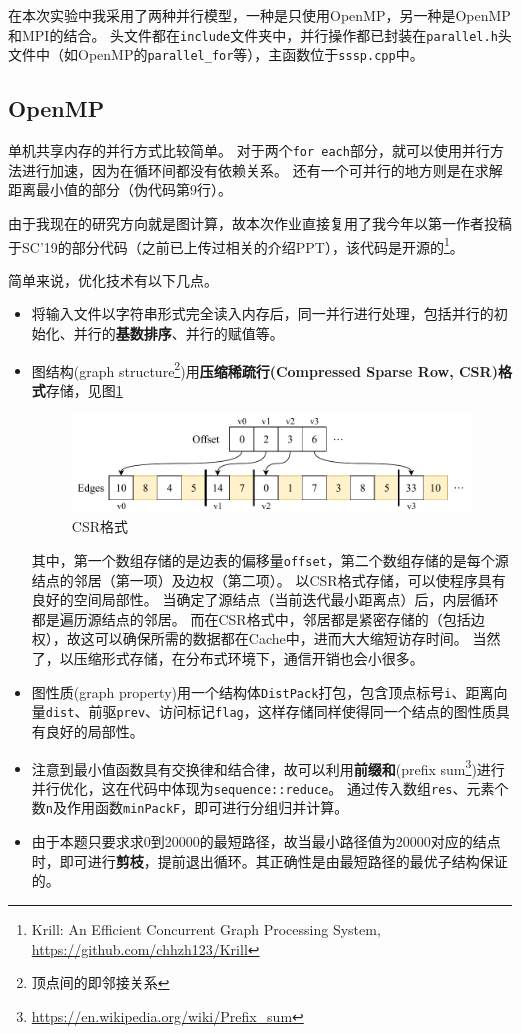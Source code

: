 \documentclass[reportComp]{thesis}
\begin{document}
在本次实验中我采用了两种并行模型，一种是只使用OpenMP，另一种是OpenMP和MPI的结合。
头文件都在\verb'include'文件夹中，并行操作都已封装在\verb'parallel.h'头文件中（如OpenMP的\verb'parallel_for'等），主函数位于\verb'sssp.cpp'中。

\subsection{OpenMP}
\label{sub:openmp}
单机共享内存的并行方式比较简单。
对于两个\verb'for each'部分，就可以使用并行方法进行加速，因为在循环间都没有依赖关系。
还有一个可并行的地方则是在求解距离最小值的部分（伪代码第9行）。

由于我现在的研究方向就是图计算，故本次作业直接复用了我今年以第一作者投稿于SC'19的部分代码（之前已上传过相关的介绍PPT），该代码是开源的\footnote{Krill: An Efficient Concurrent Graph Processing System, \url{https://github.com/chhzh123/Krill}}。

简单来说，优化技术有以下几点。
\begin{itemize}
	\item 将输入文件以字符串形式完全读入内存后，同一并行进行处理，包括并行的初始化、并行的\textbf{基数排序}、并行的赋值等。
	\item 图结构(graph structure\footnote{顶点间的即邻接关系})用\textbf{压缩稀疏行(Compressed Sparse Row, CSR)格式}存储，见图\ref{fig:csr}
	\begin{figure}[H]
	\centering
	\includegraphics[width=0.8\linewidth]{fig/CSR.pdf}
	\caption{CSR格式}
	\label{fig:csr}
	\end{figure}
	其中，第一个数组存储的是边表的偏移量\verb'offset'，第二个数组存储的是每个源结点的邻居（第一项）及边权（第二项）。
	以CSR格式存储，可以使程序具有良好的空间局部性。
	当确定了源结点（当前迭代最小距离点）后，内层循环都是遍历源结点的邻居。
	而在CSR格式中，邻居都是紧密存储的（包括边权），故这可以确保所需的数据都在Cache中，进而大大缩短访存时间。
	当然了，以压缩形式存储，在分布式环境下，通信开销也会小很多。
	\item 图性质(graph property)用一个结构体\verb'DistPack'打包，包含顶点标号\verb'i'、距离向量\verb'dist'、前驱\verb'prev'、访问标记\verb'flag'，这样存储同样使得同一个结点的图性质具有良好的局部性。
	\item 注意到最小值函数具有交换律和结合律，故可以利用\textbf{前缀和}(prefix sum\footnote{\url{https://en.wikipedia.org/wiki/Prefix_sum}})进行并行优化，这在代码中体现为\verb'sequence::reduce'。
	通过传入数组\verb'res'、元素个数\verb'n'及作用函数\verb'minPackF'，即可进行分组归并计算。
	\item 由于本题只要求求0到20000的最短路径，故当最小路径值为20000对应的结点时，即可进行\textbf{剪枝}，提前退出循环。其正确性是由最短路径的最优子结构保证的。
\end{itemize}
\end{document}
